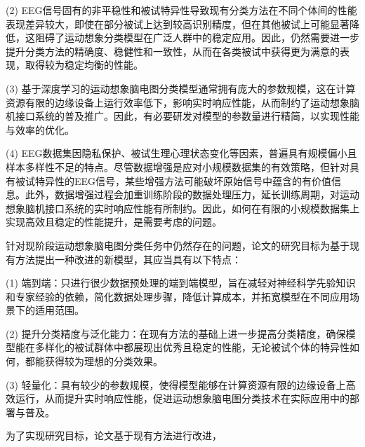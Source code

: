 (2) EEG信号固有的非平稳性和被试特异性导致现有分类方法在不同个体间的性能表现差异较大，即使在部分被试上达到较高识别精度，但在其他被试上可能显著降低，这阻碍了运动想象分类模型在广泛人群中的稳定应用。因此，仍然需要进一步提升分类方法的精确度、稳健性和一致性，从而在各类被试中获得更为满意的表现，取得较为稳定均衡的性能。

(3) 基于深度学习的运动想象脑电图分类模型通常拥有庞大的参数规模，这在计算资源有限的边缘设备上运行效率低下，影响实时响应性能，从而制约了运动想象脑机接口系统的普及推广。因此，有必要研发对模型的参数量进行精简，以实现性能与效率的优化。

(4) EEG数据集因隐私保护、被试生理心理状态变化等因素，普遍具有规模偏小且样本多样性不足的特点。尽管数据增强是应对小规模数据集的有效策略，但针对具有被试特异性的EEG信号，某些增强方法可能破坏原始信号中蕴含的有价值信息。此外，数据增强过程会加重训练阶段的数据处理压力，延长训练周期，对运动想象脑机接口系统的实时响应性能有所制约。因此，如何在有限的小规模数据集上实现高效且稳定的性能提升，是需要考虑的问题。




针对现阶段运动想象脑电图分类任务中仍然存在的问题，论文的研究目标为基于现有方法提出一种改进的新模型，其应当具有以下特点：

(1) 端到端：只进行很少数据预处理的端到端模型，旨在减轻对神经科学先验知识和专家经验的依赖，简化数据处理步骤，降低计算成本，并拓宽模型在不同应用场景下的适用范围。

(2) 提升分类精度与泛化能力：在现有方法的基础上进一步提高分类精度，确保模型能在多样化的被试群体中都展现出优秀且稳定的性能，无论被试个体的特异性如何，都能获得较为理想的分类效果。

(3) 轻量化：具有较少的参数规模，使得模型能够在计算资源有限的边缘设备上高效运行，从而提升实时响应性能，促进运动想象脑电图分类技术在实际应用中的部署与普及。

为了实现研究目标，论文基于现有方法进行改进，